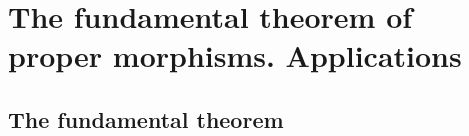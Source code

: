 \section{The fundamental theorem of proper morphisms. Applications}
\label{section:III.4}


\subsection{The fundamental theorem}
\label{subsection:III.4.1}














